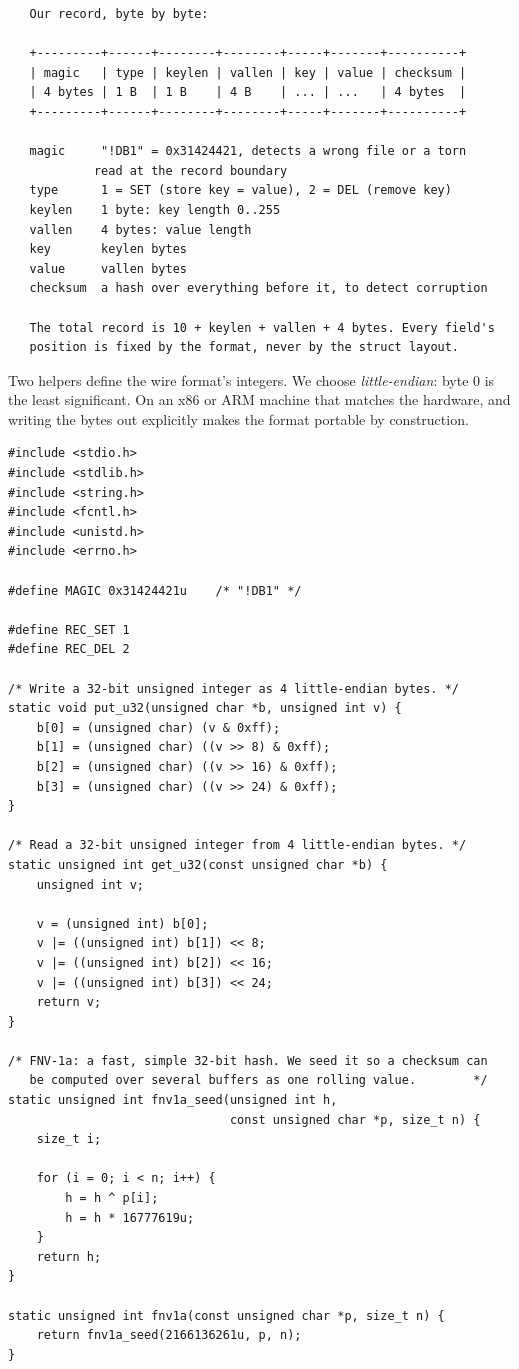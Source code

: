 \begin{verbatim}
   Our record, byte by byte:

   +---------+------+--------+--------+-----+-------+----------+
   | magic   | type | keylen | vallen | key | value | checksum |
   | 4 bytes | 1 B  | 1 B    | 4 B    | ... | ...   | 4 bytes  |
   +---------+------+--------+--------+-----+-------+----------+

   magic     "!DB1" = 0x31424421, detects a wrong file or a torn
            read at the record boundary
   type      1 = SET (store key = value), 2 = DEL (remove key)
   keylen    1 byte: key length 0..255
   vallen    4 bytes: value length
   key       keylen bytes
   value     vallen bytes
   checksum  a hash over everything before it, to detect corruption

   The total record is 10 + keylen + vallen + 4 bytes. Every field's
   position is fixed by the format, never by the struct layout.
\end{verbatim}

Two helpers define the wire format's integers. We choose
\emph{little-endian}: byte 0 is the least significant. On an x86 or
ARM machine that matches the hardware, and writing the bytes out
explicitly makes the format portable by construction.

\begin{lstlisting}[caption={Serialization helpers: ints as bytes, on purpose.}]
#include <stdio.h>
#include <stdlib.h>
#include <string.h>
#include <fcntl.h>
#include <unistd.h>
#include <errno.h>

#define MAGIC 0x31424421u    /* "!DB1" */

#define REC_SET 1
#define REC_DEL 2

/* Write a 32-bit unsigned integer as 4 little-endian bytes. */
static void put_u32(unsigned char *b, unsigned int v) {
    b[0] = (unsigned char) (v & 0xff);
    b[1] = (unsigned char) ((v >> 8) & 0xff);
    b[2] = (unsigned char) ((v >> 16) & 0xff);
    b[3] = (unsigned char) ((v >> 24) & 0xff);
}

/* Read a 32-bit unsigned integer from 4 little-endian bytes. */
static unsigned int get_u32(const unsigned char *b) {
    unsigned int v;

    v = (unsigned int) b[0];
    v |= ((unsigned int) b[1]) << 8;
    v |= ((unsigned int) b[2]) << 16;
    v |= ((unsigned int) b[3]) << 24;
    return v;
}

/* FNV-1a: a fast, simple 32-bit hash. We seed it so a checksum can
   be computed over several buffers as one rolling value.        */
static unsigned int fnv1a_seed(unsigned int h,
                               const unsigned char *p, size_t n) {
    size_t i;

    for (i = 0; i < n; i++) {
        h = h ^ p[i];
        h = h * 16777619u;
    }
    return h;
}

static unsigned int fnv1a(const unsigned char *p, size_t n) {
    return fnv1a_seed(2166136261u, p, n);
}
\end{lstlisting}


